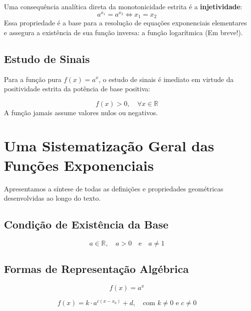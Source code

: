 \documentclass[12pt,a4paper]{report}
\begin{document}
	Uma consequência analítica direta da monotonicidade estrita é a \textbf{injetividade}:
	$$a^{x_1} = a^{x_2} \iff x_1 = x_2$$
	Essa propriedade é a base para a resolução de equações exponenciais elementares e assegura a existência de sua função inversa: a função logarítmica (Em breve!).
	
	\section{Estudo de Sinais}
	\label{subsec:estudo_sinais}
	
	Para a função pura $f(x) = a^x$, o estudo de sinais é imediato em virtude da positividade estrita da potência de base positiva:
	
	\begin{destaque}[Estudo de Sinais para $f(x) = a^x$]
		\label{dest:sinais_pura}
		$$f(x) > 0, \quad \forall x \in \mathbb{R}$$
		A função jamais assume valores nulos ou negativos.
	\end{destaque}
	
	
	\chapter{Uma Sistematização Geral das Funções Exponenciais}
	

	
	\label{sec:sistematizacao_exp}
	
	Apresentamos a síntese de todas as definições e propriedades geométricas desenvolvidas ao longo do texto.
	
	\section{Condição de Existência da Base}
	\begin{destaque}
		$$a \in \mathbb{R}, \quad a > 0 \quad \text{e} \quad a \neq 1$$
	\end{destaque}
	
	\section{Formas de Representação Algébrica}
	\begin{destaque}
		$$f(x) = a^x$$
	\end{destaque}
	
	\begin{destaque}
		$$f(x) = k \cdot a^{c(x - x_0)} + d, \quad \text{com } k \neq 0 \text{ e } c \neq 0$$
	\end{destaque}
	
\end{document}

